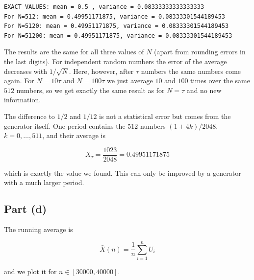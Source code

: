 \documentclass[11pt]{article}
\begin{document}
    \begin{Verbatim}[commandchars=\\\{\}]
EXACT VALUES: mean = 0.5 , variance = 0.08333333333333333
For N=512: mean = 0.49951171875, variance = 0.08333301544189453
For N=5120: mean = 0.49951171875, variance = 0.08333301544189453
For N=51200: mean = 0.49951171875, variance = 0.08333301544189453
    \end{Verbatim}

    The results are the same for all three values of \(N\) (apart from
rounding errors in the last digits). For independent random numbers the
error of the average decreases with \(1/\sqrt{N}\). Here, however, after
\(\tau\) numbers the same numbers come again. For \(N=10\tau\) and
\(N=100\tau\) we just average \(10\) and \(100\) times over the same
\(512\) numbers, so we get exactly the same result as for \(N=\tau\) and
no new information.

The difference to \(1/2\) and \(1/12\) is not a statistical error but
comes from the generator itself. One period contains the \(512\) numbers
\((1+4k)/2048\), \(k=0,\dots,511\), and their average is

\[
\bar{X}_\tau=\frac{1023}{2048}=0.49951171875 \tag{4}
\]

which is exactly the value we found. This can only be improved by a
generator with a much larger period.

    \subsection*{Part (d)}

The running average is

\[
\bar{X}(n)=\frac{1}{n}\sum_{i=1}^{n}U_i \tag{5}
\]

and we plot it for \(n\in[30000,40000]\).
\end{document}
